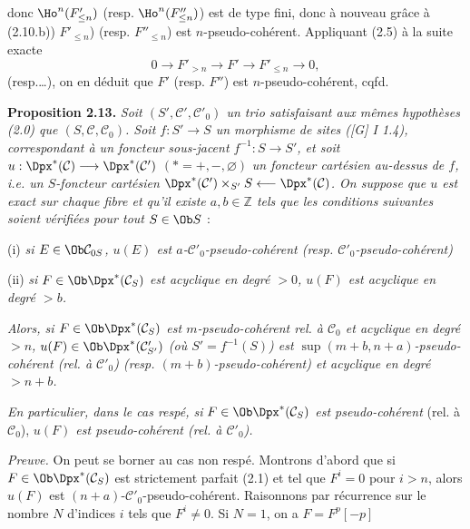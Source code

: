 donc \(\Ho^n(F'_{\leq n})\) (resp. \(\Ho^n(F''_{\leq n})\)) est de type fini, donc à nouveau grâce à (2.10.b)) \(F'_{\leq n}\)) (resp. \(F''_{\leq n}\)) est \(n\)-pseudo-cohérent. Appliquant (2.5) à la suite exacte
\[
  0\longrightarrow F'_{>n}\longrightarrow F'\longrightarrow F'_{\leq n}\longrightarrow 0,
\]
(resp.\dots), on en déduit que \(F'\) (resp. \(F''\)) est \(n\)-pseudo-cohérent, cqfd.

\textbf{Proposition 2.13.} \emph{Soit \((S',\mathcal C',\mathcal C'_0)\) un trio satisfaisant aux mêmes hypothèses (2.0) que \((S,\mathcal C,\mathcal C_0)\). Soit \(f:S'\to S\) un morphisme de sites ([G] I 1.4), correspondant à un foncteur sous-jacent \(f^{-1}:S\to S'\), et soit}
\(u:\Dpx^*(\mathcal C)\longrightarrow \Dpx^*(\mathcal C')\) \((*=+,-,\varnothing)\)
\emph{un foncteur cartésien au-dessus de \(f\), i.e. un \(S\)-foncteur cartésien \(\Dpx^*(\mathcal C')\times_{S'}S\longleftarrow\Dpx^*(\mathcal C)\). On suppose que \(u\) est exact sur chaque fibre et qu'il existe \(a,b\in\mathbb Z\) tels que les conditions suivantes soient vérifiées pour tout \(S\in\Ob S\)} :

(i) \emph{si \(E\in\Ob\mathcal C_{0S}\), \(u(E)\) est \(a\)-\(\mathcal C'_0\)-pseudo-cohérent (resp. \(\mathcal C'_0\)-pseudo-cohérent)}

(ii) \emph{si \(F\in\Ob\Dpx^*(\mathcal C_S)\) est acyclique en degré \(>0\), \(u(F)\) est acyclique en degré \(>b\).}

\emph{Alors, si \(F\in\Ob\Dpx^*(\mathcal C_S)\) est \(m\)-pseudo-cohérent rel. à \(\mathcal C_0\) et acyclique en degré \(>n\), \(u(F)\in\Ob\Dpx^*(\mathcal C'_{S'})\) (où \(S'=f^{-1}(S)\)) est \(\sup(m+b,n+a)\)-pseudo-cohérent (rel. à \(\mathcal C'_0\)) (resp. \((m+b)\)-pseudo-cohérent) et acyclique en degré \(>n+b\).}

\emph{En particulier, dans le cas respé, si \(F\in\Ob\Dpx^*(\mathcal C_S)\) est pseudo-cohérent} (rel. à \(\mathcal C_0\)), \emph{\(u(F)\) est pseudo-cohérent (rel. à \(\mathcal C'_0\)).}

\emph{Preuve.} On peut se borner au cas non respé. Montrons d'abord que si \(F\in\Ob\Dpx^*(\mathcal C_S)\) est strictement parfait (2.1) et tel que \(F^i=0\) pour \(i>n\), alors \(u(F)\) est \((n+a)\)-\(\mathcal C'_0\)-pseudo-cohérent. Raisonnons par récurrence sur le nombre \(N\) d'indices \(i\) tels que \(F^i\neq0\). Si \(N=1\), on a \(F=F^p[-p]\)
